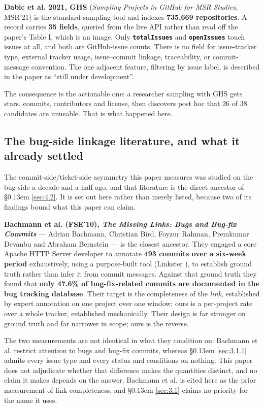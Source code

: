 \documentclass[conference]{IEEEtran}
\begin{document}
\textbf{Dabic et al. 2021, GHS} \cite{dabic2021sampling} (\emph{Sampling Projects in GitHub for MSR Studies}, MSR'21) is the standard sampling tool and indexes \textbf{735,669 repositories}. A record carries \textbf{35 fields}, queried from the live API rather than read off the paper's Table I, which is an image. Only \textbf{\texttt{totalIssues}} and \textbf{\texttt{openIssues}} touch issues at all, and both are GitHub-issue counts. There is no field for issue-tracker type, external tracker usage, issue--commit linkage, traceability, or commit-message convention. The one adjacent feature, filtering by issue label, is described in the paper as ``still under development''.

The consequence is the actionable one: a researcher sampling with GHS gets stars, commits, contributors and license, then discovers post hoc that 26 of 38 candidates are unusable. That is what happened here.

\subsection{The bug-side linkage literature, and what it already settled}
\label{sec:2.4}

The commit-side/ticket-side asymmetry this paper measures was studied on the bug-side a decade and a half ago, and that literature is the direct ancestor of \S\kern0.13em \ref{sec:4.2}. It is set out here rather than merely listed, because two of its findings bound what this paper can claim.

\textbf{Bachmann et al. (FSE'10), \emph{The Missing Links: Bugs and Bug-fix Commits}} \cite{bachmann2010missing} --- Adrian Bachmann, Christian Bird, Foyzur Rahman, Premkumar Devanbu and Abraham Bernstein --- is the closest ancestor. They engaged a core Apache HTTP Server developer to annotate \textbf{493 commits over a six-week period} exhaustively, using a purpose-built tool (Linkster \cite{bird2010linkster}), to establish ground truth rather than infer it from commit messages. Against that ground truth they found that \textbf{only 47.6\% of bug-fix-related commits are documented in the bug tracking database}. Their target is the completeness of the \emph{link}, established by expert annotation on one project over one window; ours is a per-project rate over a whole tracker, established mechanically. Their design is far stronger on ground truth and far narrower in scope; ours is the reverse.

The two measurements are not identical in what they condition on: Bachmann et al. restrict attention to bugs and bug-fix commits, whereas \S\kern0.13em \ref{sec:3.1.1} admits every issue type and every status and conditions on nothing. This paper does not adjudicate whether that difference makes the quantities distinct, and no claim it makes depends on the answer. Bachmann et al. is cited here as the prior measurement of link completeness, and \S\kern0.13em \ref{sec:3.1} claims no priority for the name it uses.
\end{document}

